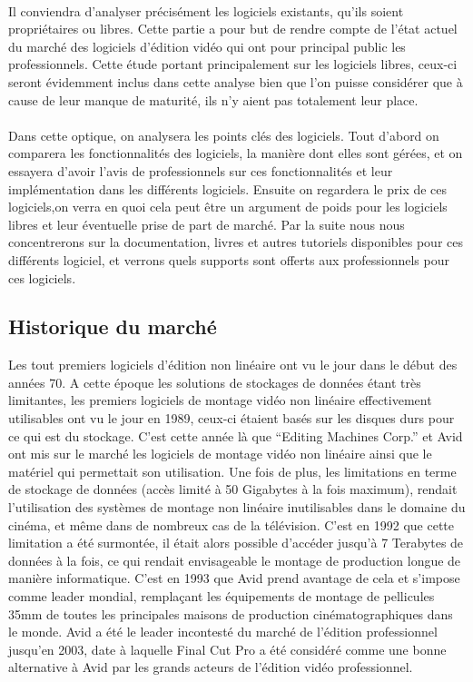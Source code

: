 \paragraph{}

Il conviendra d'analyser précisément les logiciels existants, qu'ils
soient propriétaires ou libres. Cette partie a pour but de rendre compte
de l'état actuel du marché des logiciels d'édition vidéo qui ont pour
principal public les professionnels. Cette étude portant principalement
sur les logiciels libres, ceux-ci seront évidemment inclus dans cette
analyse bien que l'on puisse considérer que à cause de leur manque de
maturité, ils n'y aient pas totalement leur place.

\paragraph{}

Dans cette optique, on analysera les points clés des logiciels.
Tout d'abord on comparera les fonctionnalités des logiciels, la
manière dont elles sont gérées, et on essayera d'avoir l'avis de
professionnels sur ces fonctionnalités et leur implémentation dans les
différents logiciels. Ensuite on regardera le prix de ces logiciels,on
verra en quoi cela peut être un argument de poids pour les logiciels
libres et leur éventuelle prise de part de marché. Par la suite nous
nous concentrerons sur la documentation, livres et autres tutoriels
disponibles pour ces différents logiciel, et verrons quels supports
sont offerts aux professionnels pour ces logiciels.

\subsection {Historique du marché}

Les tout premiers logiciels d'édition non linéaire ont vu le jour dans
le début des années 70.  A cette époque les solutions de stockages
de données étant très limitantes, les premiers logiciels de montage
vidéo non linéaire effectivement utilisables ont vu le jour en
1989, ceux-ci étaient basés sur les disques durs pour ce qui est du
stockage. C'est cette année là que ``Editing Machines Corp.'' et Avid
ont mis sur le marché les logiciels de montage vidéo non linéaire
ainsi que le matériel qui permettait son utilisation. Une fois de plus,
les limitations en terme de stockage de données (accès limité à
50 Gigabytes à la fois maximum), rendait l'utilisation des systèmes
de montage non linéaire inutilisables dans le domaine du cinéma,
et même dans de nombreux cas de la télévision. C'est en 1992 que
cette limitation a été surmontée, il était alors possible d'accéder
jusqu'à 7 Terabytes de données à la fois, ce qui rendait envisageable
le montage de production longue de manière informatique. C'est en
1993 que Avid prend avantage de cela et s'impose comme leader mondial,
remplaçant les équipements de montage de pellicules 35mm de toutes
les principales maisons de production cinématographiques dans le
monde. Avid a été le leader incontesté du marché de l'édition
professionnel jusqu'en 2003, date à laquelle Final Cut Pro a été
considéré comme une bonne alternative à Avid par les grands acteurs
de l'édition vidéo professionnel.

